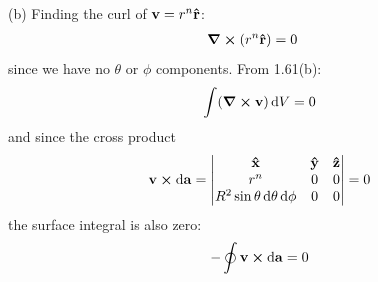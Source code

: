 \documentclass[../main.tex]{subfiles}
\begin{document}
(b) Finding the curl of $\vb{v} = r^n \vu{r}$:
\begin{align*}
    \curl (r^n \vu{r}) &= 0
\end{align*}
since we have no $\theta$ or $\phi$ components. From 1.61(b):
\begin{align*}
    \int (\curl \vb{v}) \dd{V} = 0 
\end{align*}
and since the cross product
\begin{align*}
    \vb{v} \cp \dd{\vb{a}} = \begin{vmatrix}
        \vu{x} & \vu{y} & \vu{z} \\
        r^n & 0 & 0 \\
        R^2 \sin\theta \dd{\theta} \dd{\phi} & 0 & 0
    \end{vmatrix} = 0
\end{align*}
the surface integral is also zero:
\begin{align*}
    - \oint \vb{v} \cp \dd{\vb{a}} = 0
\end{align*}
\end{document}
